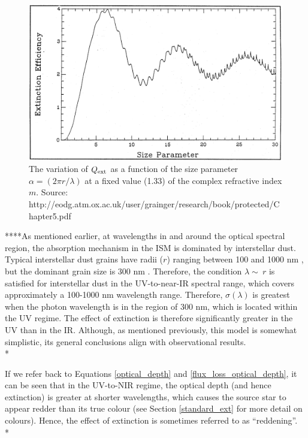 \documentclass[12pt, a4paper]{report}
\begin{document}
\begin{figure}[h!]
\begin{center}
\includegraphics[width=1.0\textwidth]{grainger_ch5_Qext_vs_wavelength.png}
\caption{The variation of $Q_{\textnormal{ext}}$ as a function of the size parameter $\alpha = (2\pi r/\lambda)$ at a fixed value (1.33) of the complex refractive index $m$. Source: http://eodg.atm.ox.ac.uk/user/grainger/research/book/protected/Chapter5.pdf}
\label{Qlambda_curve}
\end{center}
\end{figure}

****As mentioned earlier, at wavelengths in and around the optical spectral region, the absorption mechanism in the ISM is dominated by interstellar dust. Typical interstellar dust grains have radii ($r$) ranging between 100 and 1000 nm \citep{2000JGR...10510299W}, but the dominant grain size is 300 nm \citep{2003JGRA..108.8030L}. Therefore, the condition $\lambda \sim\ r$ is satisfied for interstellar dust in the UV-to-near-IR spectral range, which covers approximately a 100-1000 nm wavelength range. Therefore, $\sigma(\lambda)$ is greatest when the photon wavelength is in the region of 300 nm, which is located within the UV regime. The effect of extinction is therefore significantly greater in the UV than in the IR. Although, as mentioned previously, this model is somewhat simplistic, its general conclusions align with observational results.\\*

If we refer back to Equations \ref{optical_depth} and \ref{flux_loss_optical_depth}, it can be seen that in the UV-to-NIR regime, the optical depth (and hence extinction) is greater at shorter wavelengths,  which causes the source star to appear redder than its true colour (see Section \ref{standard_ext} for more detail on colours). Hence, the effect of extinction is sometimes referred to as ``reddening''. \\*
\end{document}

